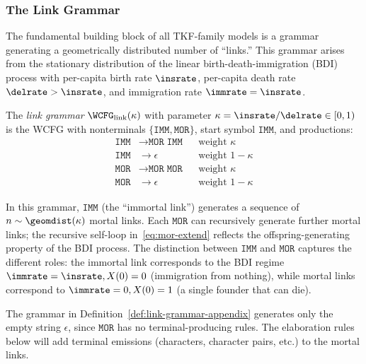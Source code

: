 \subsubsection{The Link Grammar}
\label{sec:base-appendix}

The fundamental building block of all TKF-family models is a grammar
generating a geometrically distributed number of ``links.''
This grammar arises from the stationary distribution of the linear
birth-death-immigration (BDI) process with per-capita birth rate
$\insrate$, per-capita death rate $\delrate > \insrate$, and
immigration rate $\immrate = \insrate$.

\begin{definition}
\label{def:link-grammar-appendix}
The \emph{link grammar} $\WCFG_{\mathrm{link}}(\kappa)$ with
parameter $\kappa = \insrate/\delrate \in [0,1)$ is the WCFG
with nonterminals $\{\texttt{IMM}, \texttt{MOR}\}$, start symbol
$\texttt{IMM}$, and productions:
\begin{align}
\texttt{IMM} &\to \texttt{MOR}\;\texttt{IMM} && \text{weight } \kappa \label{eq:imm-extend} \\
\texttt{IMM} &\to \epsilon && \text{weight } 1-\kappa \label{eq:imm-end} \\
\texttt{MOR} &\to \texttt{MOR}\;\texttt{MOR} && \text{weight } \kappa \label{eq:mor-extend} \\
\texttt{MOR} &\to \epsilon && \text{weight } 1-\kappa \label{eq:mor-end}
\end{align}
\end{definition}

\begin{remark}
In this grammar, $\texttt{IMM}$ (the ``immortal link'') generates
a sequence of $n \sim \geomdist(\kappa)$ mortal links.
Each $\texttt{MOR}$ can recursively generate further mortal links;
the recursive self-loop in~\eqref{eq:mor-extend} reflects the
offspring-generating property of the BDI process.
The distinction between $\texttt{IMM}$ and $\texttt{MOR}$
captures the different roles: the immortal link corresponds to the
BDI regime $\immrate = \insrate, X(0) = 0$ (immigration from nothing),
while mortal links correspond to $\immrate = 0, X(0) = 1$
(a single founder that can die).
\end{remark}

\begin{remark}
The grammar in Definition~\ref{def:link-grammar-appendix} generates only
the empty string $\epsilon$, since $\texttt{MOR}$ has no terminal-producing
rules.  The elaboration rules below will add terminal emissions
(characters, character pairs, etc.) to the mortal links.
\end{remark}

